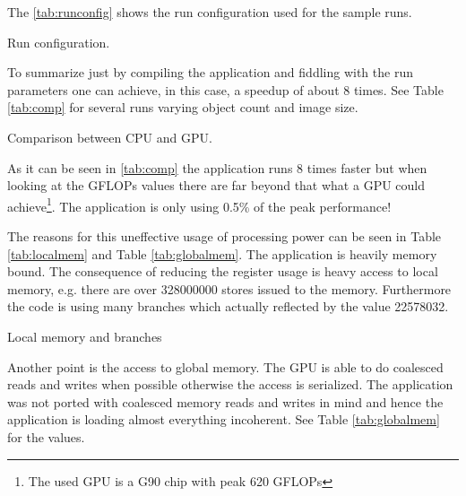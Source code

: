 The \autoref{tab:runconfig} shows the run configuration used for the sample runs. 

\begin{table}[ht]
	\centering
  	\caption[Run configuration]{Run configuration.}	
	\label{tab:runconfig}
\end{table}



To summarize just by compiling the application and fiddling with the run
parameters one can achieve, in this case, a speedup of about 8 times. See Table
\autoref{tab:comp} for several runs varying object count and image size.

\begin{table}[ht]
	\centering
	\caption[Comparison between CPU and GPU]{Comparison between CPU and GPU.}
	\label{tab:comp}
\end{table}
	
	
As it can be seen in \autoref{tab:comp} the application runs 8 times faster but
when looking at the \glspl{GFLOP} values there are far beyond that what a
\gls{GPU} could achieve\footnote{The used \gls{GPU} is a G90 chip with peak 620
\glspl{GFLOP}}. The application is only using 0.5\% of the peak
performance!


The reasons for this uneffective usage of processing power can be seen in Table
\autoref{tab:localmem} and Table \autoref{tab:globalmem}. The application is
heavily memory bound. The consequence of reducing the register usage is heavy
access to local memory, e.g. there are over 328000000 stores issued to the
memory. Furthermore the code is using many branches which actually reflected by
the value 22578032.


\begin{table}[ht]
	\centering
	\qquad
	
	\caption{Local memory and branches}
\end{table}

Another point is the access to global memory. The \gls{GPU} is able to do
coalesced reads and writes when possible otherwise the access is serialized. The
application was not ported with coalesced memory reads and writes in mind and
hence the application is loading almost everything incoherent. See Table
\autoref{tab:globalmem} for the values.

